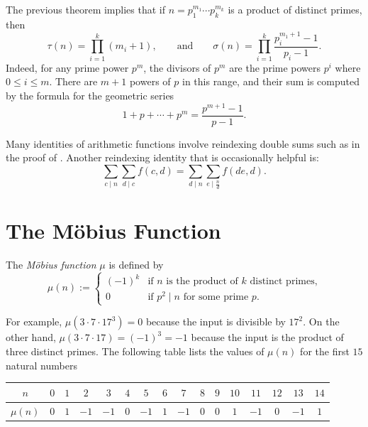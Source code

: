 The previous theorem implies that if $n=p_1^{m_1}\cdots p_k^{m_k}$ is a product of distinct primes, then
\begin{equation*}
  \tau(n)=\prod_{i=1}^k(m_i+1),\qquad\text{and}\qquad\sigma(n)=\prod_{i=1}^k\frac{p_i^{m_1+1}-1}{p_i-1}.
\end{equation*}
Indeed, for any prime power $p^m$, the divisors of $p^m$ are the prime powers $p^i$ where $0\leq i\leq m$. There are $m+1$ powers of $p$ in this range, and their sum is computed by the formula for the geometric series
\begin{equation*}
  1+p+\cdots +p^m=\frac{p^{m+1}-1}{p-1}.
\end{equation*}

\begin{remark}
  Many identities of arithmetic functions involve reindexing double sums such as in the proof of . Another reindexing identity that is occasionally helpful is:
  \begin{equation*}
    \sum_{c\mid n}\sum_{d\mid c}f(c,d)=\sum_{d\mid n}\sum_{e\mid \frac{n}{d}}f(de,d).
  \end{equation*}
\end{remark}

\section{The M\"obius Function}

\begin{definition}
  The \emph{M\"obius function} $\mu$ is defined by
  \begin{equation*}
    \mu(n) :=
    \begin{cases}
      (-1)^k & \text{if $n$ is the product of $k$ distinct primes,} \\
      0 & \text{if $p^2\mid n$ for some prime $p$.}
    \end{cases}
  \end{equation*}
\end{definition}

For example, $\mu(3\cdot 7\cdot 17^3)=0$ because the input is divisible by $17^2$. On the other hand, $\mu(3\cdot 7\cdot 17)=(-1)^3=-1$ because the input is the product of three distinct primes.
The following table lists the values of $\mu(n)$ for the first $15$ natural numbers

\begin{center}
  \begin{tabular}{c|ccccccccccccccc}
    $n$ & $0$ & $1$ & $2$ & $3$ & $4$ & $5$ & $6$ & $7$ & $8$ & $9$ & $10$ & $11$ & $12$ & $13$ & $14$ \\ \midrule
    $\mu(n)$ & $0$ & $1$ & $-1$ & $-1$ & $0$ & $-1$ & $1$ & $-1$ & $0$ & $0$ & $1$ & $-1$ & $0$ & $-1$ & $1$
  \end{tabular}
\end{center}


